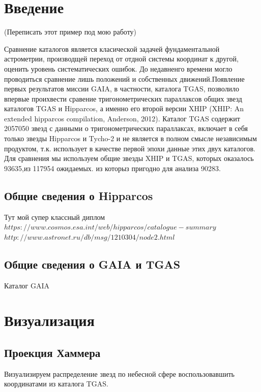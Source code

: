 \documentclass[14pt]{article} %
\begin{document}
 
\section{Введение}\label{introduction}

(Переписать этот пример под мою работу)


Сравнение каталогов является класической задачей фундаментальной\\ астрометрии, производщей переход от отдной системы координат к другой, оценить уровень систематических ошибок. До недавненго времени могло проводиться сравнение лишь положений и собственных движений.Появление первых результатов миссии GAIA, в частности, каталога TGAS, позволило впервые проихвести сравение тригонометрических параллаксов общих звезд каталогов TGAS и  Hipparcos, а именно его второй версии XHIP (XHIP: An extended hipparcos compilation, Anderson, 2012). Каталог TGAS содержит 2057050 звезд с данными о тригонометрических параллаксах, включает в себя только звезды Hipparcos и Tycho-2  и не является в полном смысле независимым продуктом, т.к. использует в качестве первой эпохи данные этих двух каталогов. Для сравнения мы используем общие звезды XHIP  и TGAS, которых оказалось 93635,из 117954 ожидаемых. из которыз пригодно для анализа 90283.

\subsection{Общие сведения о Hipparcos}\label{sub:smthhip}
 Тут мой супер классный диплом
$https://www.cosmos.esa.int/web/hipparcos/catalogue-summary$
$http://www.astronet.ru/db/msg/1210304/node2.html$

\subsection{Общие сведения о GAIA и TGAS}\label{sub:smthgaia}
Каталог GAIA

\section{Визуализация}\label{errvid}

\subsection{Проекция Хаммера}\label{sub:smthrs}

Визуализируем распределение звезд по небесной сфере воспользовавшить координатами из каталога TGAS. 
\end{document}
